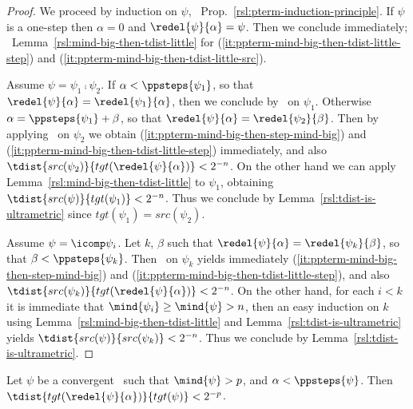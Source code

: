 \begin{proof}
We proceed by induction on $\psi$, \confer\ Prop.~\ref{rsl:pterm-induction-principle}.
If $\psi$ is a one-step then $\alpha = 0$ and $\redel{\psi}{\alpha} = \psi$.
Then we conclude immediately; \confer\ Lemma~\ref{rsl:mind-big-then-tdist-little} for (\ref{it:ppterm-mind-big-then-tdist-little-step}) and (\ref{it:ppterm-mind-big-then-tdist-little-src}).

Assume $\psi = \psi_1 \comp \psi_2$.
If $\alpha < \ppsteps{\psi_1}$, so that $\redel{\psi}{\alpha} = \redel{\psi_1}{\alpha}$, then we conclude by \ih\ on $\psi_1$.
Otherwise $\alpha = \ppsteps{\psi_1} + \beta$, so that $\redel{\psi}{\alpha} = \redel{\psi_2}{\beta}$. Then by applying \ih\ on $\psi_2$ we obtain (\ref{it:ppterm-mind-big-then-step-mind-big}) and (\ref{it:ppterm-mind-big-then-tdist-little-step}) immediately, and also $\tdist{src(\psi_2)}{tgt(\redel{\psi}{\alpha})} < 2^{-n}$.
On the other hand we can apply Lemma~\ref{rsl:mind-big-then-tdist-little} to $\psi_1$, obtaining $\tdist{src(\psi)}{tgt(\psi_1)} < 2^{-n}$. Thus we conclude by Lemma~\ref{rsl:tdist-is-ultrametric} since $tgt(\psi_1) = src(\psi_2)$.

Assume $\psi = \icomp \psi_i$. Let $k$, $\beta$ such that $\redel{\psi}{\alpha} = \redel{\psi_k}{\beta}$, so that $\beta < \ppsteps{\psi_k}$.
Then \ih\ on $\psi_k$ yields immediately (\ref{it:ppterm-mind-big-then-step-mind-big}) and (\ref{it:ppterm-mind-big-then-tdist-little-step}), and also $\tdist{src(\psi_k)}{tgt(\redel{\psi}{\alpha})} < 2^{-n}$.
On the other hand, for each $i < k$ it is immediate that $\mind{\psi_i} \geq \mind{\psi} > n$, then an easy induction on $k$ using Lemma~\ref{rsl:mind-big-then-tdist-little} and Lemma~\ref{rsl:tdist-is-ultrametric} yields $\tdist{src(\psi)}{src(\psi_{k})} < 2^{-n}$. Thus we conclude by Lemma~\ref{rsl:tdist-is-ultrametric}.
\end{proof}


\begin{lemma}
\label{rsl:ppterm-mind-big-then-tdist-little-tgt}
Let $\psi$ be a convergent \ppterm\ such that $\mind{\psi} > p$, and $\alpha < \ppsteps{\psi}$.
Then $\tdist{tgt(\redel{\psi}{\alpha})}{tgt(\psi)} < 2^{-p}$.
\end{lemma}

